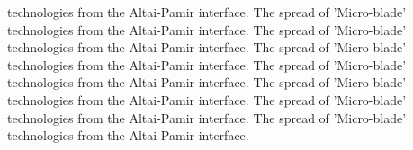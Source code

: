 technologies from the Altai-Pamir interface. The spread of 'Micro-blade' technologies from the Altai-Pamir interface. The spread of 'Micro-blade' technologies from the Altai-Pamir interface. The spread of 'Micro-blade' technologies from the Altai-Pamir interface. The spread of 'Micro-blade' technologies from the Altai-Pamir interface. The spread of 'Micro-blade' technologies from the Altai-Pamir interface. The spread of 'Micro-blade' technologies from the Altai-Pamir interface. The spread of 'Micro-blade' technologies from the Altai-Pamir interface. 

